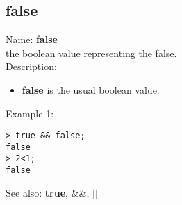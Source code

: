 \subsection{ false }
\noindent Name: \textbf{false}\\
the boolean value representing the false.\\

\noindent Description: \begin{itemize}

\item \textbf{false} is the usual boolean value.
\end{itemize}
\noindent Example 1: 
\begin{center}\begin{minipage}{15cm}\begin{Verbatim}[frame=single]
> true && false;
false
> 2<1;
false
\end{Verbatim}
\end{minipage}\end{center}
See also: \textbf{true}, \textbf{$\&\&$}, \textbf{$||$}
